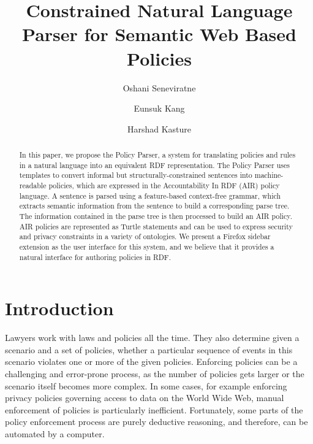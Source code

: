 \documentclass{llncs}
\begin{document}
\title{Constrained Natural Language Parser for Semantic Web Based Policies}

\author{Oshani Seneviratne \and Eunsuk Kang \and Harshad Kasture}


\maketitle
\begin{abstract}

In this paper, we propose the Policy Parser, a system for translating
policies and rules in a natural language into an equivalent RDF
representation. The Policy Parser uses
templates to convert informal but structurally-constrained sentences into 
machine-readable policies, which are expressed in the
Accountability In RDF (AIR) policy language. A sentence is parsed
using a feature-based context-free grammar, which extracts semantic
information from the sentence to build a corresponding parse tree. The
information contained in the parse tree is then processed to build
an AIR policy. AIR policies are represented as Turtle statements and
can be used to express security and privacy constraints in a variety
of ontologies. We present a Firefox sidebar extension as the user interface for this
system, and we believe that it provides a natural interface for authoring
policies in RDF.

\end{abstract}


\section{Introduction}								
\label{sec:intro}

Lawyers work with laws and policies all the time. They also determine given a scenario and a set of policies, whether a particular sequence of events in this scenario violates one or more of the given policies. Enforcing policies can be a challenging and error-prone process, as the number of policies gets larger or the scenario itself becomes more complex. In some cases, for example enforcing privacy policies governing access to data on the World Wide Web, manual enforcement of policies is particularly inefficient. Fortunately, some parts of the policy enforcement process are purely deductive reasoning, and therefore, can be automated by a computer. 
\end{document}
